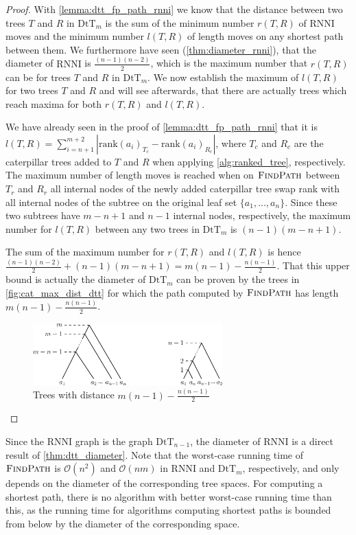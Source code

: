 \documentclass[11pt]{amsart}
\newcommand{\rnni}{\mathrm{RNNI}}
\newcommand{\findpath}{\textsc{FindPath}}
\newcommand{\rank}{\mathrm{rank}}
\newcommand{\dtt}{\mathrm{DtT}}
\renewcommand{\O}{\mathcal O}
\begin{document}
\begin{proof}
	With \autoref{lemma:dtt_fp_path_rnni} we know that the distance between two trees $T$ and $R$ in $\dtt_m$ is the sum of the minimum number $r(T,R)$ of $\rnni$ moves and the minimum number $l(T,R)$ of length moves on any shortest path between them.
	We furthermore have seen (\autoref{thm:diameter_rnni}), that the diameter of $\rnni$ is $\frac{(n-1)(n-2)}{2}$, which is the maximum number that $r(T,R)$ can be for trees $T$ and $R$ in $\dtt_m$.
	We now establish the maximum of $l(T,R)$ for two trees $T$ and $R$ and will see afterwards, that there are actually trees which reach maxima for both $r(T,R)$ and $l(T,R)$.

	We have already seen in the proof of \autoref{lemma:dtt_fp_path_rnni} that it is $l(T,R) = \sum_{i = n+1}^{m+2} |\rank(a_{i})_{T_c} - \rank(a_{i})_{R_c}|$, where $T_c$ and $R_c$ are the caterpillar trees added to $T$ and $R$ when applying \autoref{alg:ranked_tree}, respectively.
	The maximum number of length moves is reached when on $\findpath$ between $T_r$ and $R_r$ all internal nodes of the newly added caterpillar tree swap rank with all internal nodes of the subtree on the original leaf set $\{a_1, \ldots, a_n\}$.
	Since these two subtrees have $m-n+1$ and $n-1$ internal nodes, respectively, the maximum number for $l(T,R)$ between any two trees in $\dtt_m$ is $(n-1)(m-n+1)$.

	The sum of the maximum number for $r(T,R)$ and $l(T,R)$ is hence $\frac{(n-1)(n-2)}{2} + (n-1)(m-n+1) = m(n-1) - \frac{n(n-1)}{2}$.
	That this upper bound is actually the diameter of $\dtt_m$ can be proven by the trees in \autoref{fig:cat_max_dist_dtt} for which the path computed by $\findpath$ has length $m(n-1) - \frac{n(n-1)}{2}$.
	\begin{figure}[ht]
		\includegraphics[width=0.65\textwidth]{cat_max_dist_dtt.eps}
		\caption{Trees with distance $m(n-1) - \frac{n(n-1)}{2}$}
		\label{fig:cat_max_dist_dtt}
	\end{figure}
\end{proof}

Since the $\rnni$ graph is the graph $\dtt_{n-1}$, the diameter of $\rnni$ is a direct result of \autoref{thm:dtt_diameter}.
Note that the worst-case running time of $\findpath$ is $\O(n^2)$ and $\O(nm)$ in $\rnni$ and $\dtt_m$, respectively, and only depends on the diameter of the corresponding tree spaces.
For computing a shortest path, there is no algorithm with better worst-case running time than this, as the running time for algorithms computing shortest paths is bounded from below by the diameter of the corresponding space.
\end{document}
